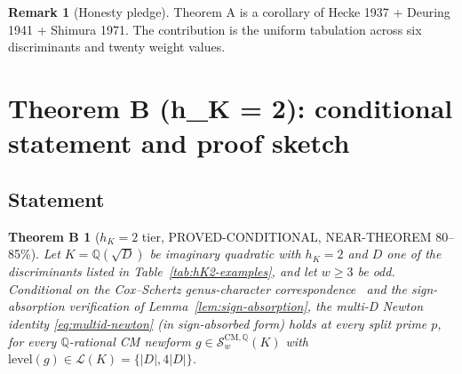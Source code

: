\documentclass[11pt,a4paper]{amsart}
\newtheorem{theoremB}[theorem]{Theorem B}
\theoremstyle{definition}
\newtheorem{remark}[theorem]{Remark}
\newcommand{\Q}{\mathbb{Q}}
\newcommand{\Lcal}{\mathcal{L}}
\newcommand{\Scal}{\mathcal{S}}
\newcommand{\hK}{h_{K}}
\begin{document}
\begin{remark}[Honesty pledge]\label{rmk:honesty-A-v4}
Theorem A is a corollary of Hecke 1937 + Deuring 1941 + Shimura 1971. The contribution is the uniform tabulation across six discriminants and twenty weight values.
\end{remark}


\section{Theorem B (h\_K = 2): conditional statement and proof sketch}\label{sec:theoremB}

\subsection{Statement}\label{sec:thmB-statement}

\begin{theoremB}[$\hK = 2$ tier, PROVED-CONDITIONAL, NEAR-THEOREM 80--85\%]\label{thm:B}
Let $K = \Q(\sqrt{D})$ be imaginary quadratic with $\hK = 2$ and $D$ one of the discriminants listed in Table~\ref{tab:hK2-examples}, and let $w \ge 3$ be odd. Conditional on the Cox--Schertz genus-character correspondence~\cite{Cox2013, Schertz2010} and the sign-absorption verification of Lemma~\ref{lem:sign-absorption}, the multi-D Newton identity \eqref{eq:multid-newton} (in sign-absorbed form) holds at every split prime $p$, for every $\Q$-rational CM newform $g \in \Scal_w^{\mathrm{CM},\Q}(K)$ with $\mathrm{level}(g) \in \Lcal(K) = \{|D|, 4|D|\}$.
\end{theoremB}
\end{document}
